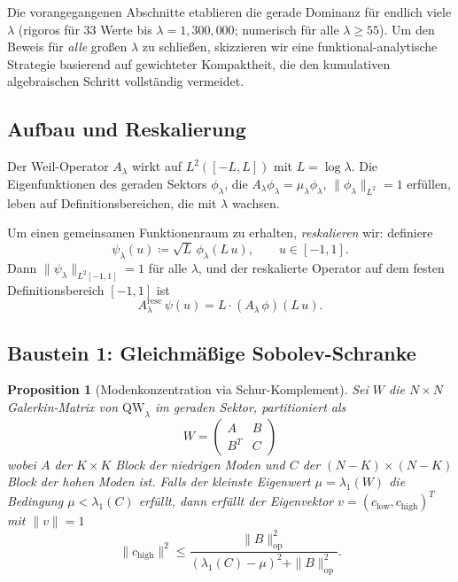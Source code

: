 \documentclass[12pt,a4paper]{article}
\newtheorem{proposition}[theorem]{Proposition}
\theoremstyle{definition}
\theoremstyle{remark}
\begin{document}
Die vorangegangenen Abschnitte etablieren die gerade Dominanz für endlich viele $\lambda$ (rigoros für $33$ Werte bis $\lambda = 1{,}300{,}000$; numerisch für alle $\lambda \geq 55$). Um den Beweis für \emph{alle} großen $\lambda$ zu schließen, skizzieren wir eine funktional-analytische Strategie basierend auf gewichteter Kompaktheit, die den kumulativen algebraischen Schritt vollständig vermeidet.

\subsection{Aufbau und Reskalierung}

Der Weil-Operator $A_\lambda$ wirkt auf $L^2([-L, L])$ mit $L = \log\lambda$. Die Eigenfunktionen des geraden Sektors $\phi_\lambda$, die $A_\lambda \phi_\lambda = \mu_\lambda \phi_\lambda$, $\|\phi_\lambda\|_{L^2} = 1$ erfüllen, leben auf Definitionsbereichen, die mit $\lambda$ wachsen.

Um einen gemeinsamen Funktionenraum zu erhalten, \emph{reskalieren} wir: definiere
\begin{equation}
\label{eq:rescaled}
\psi_\lambda(u) \coloneqq \sqrt{L}\,\phi_\lambda(L\,u), \qquad u \in [-1,1].
\end{equation}
Dann $\|\psi_\lambda\|_{L^2[-1,1]} = 1$ für alle $\lambda$, und der reskalierte Operator auf dem festen Definitionsbereich $[-1,1]$ ist
\[
  A_\lambda^{\mathrm{resc}}\,\psi(u) = L \cdot (A_\lambda\,\phi)(L\,u).
\]

\subsection{Baustein 1: Gleichm\"a\ss ige Sobolev-Schranke}

\begin{proposition}[Modenkonzentration via Schur-Komplement]
\label{prop:mode-concentration}
Sei $W$ die $N \times N$ Galerkin-Matrix von $\mathrm{QW}_\lambda$ im geraden Sektor, partitioniert als
\[
  W = \begin{pmatrix} A & B \\ B^T & C \end{pmatrix}
\]
wobei $A$ der $K \times K$ Block der niedrigen Moden und $C$ der $(N-K) \times (N-K)$ Block der hohen Moden ist. Falls der kleinste Eigenwert $\mu = \lambda_1(W)$ die Bedingung $\mu < \lambda_1(C)$ erfüllt, dann erfüllt der Eigenvektor $v = (c_{\mathrm{low}}, c_{\mathrm{high}})^T$ mit $\|v\| = 1$
\begin{equation}
\label{eq:schur-bound}
  \|c_{\mathrm{high}}\|^2 \leq \frac{\|B\|_{\mathrm{op}}^2}{(\lambda_1(C) - \mu)^2 + \|B\|_{\mathrm{op}}^2}.
\end{equation}
\end{proposition}
\end{document}
